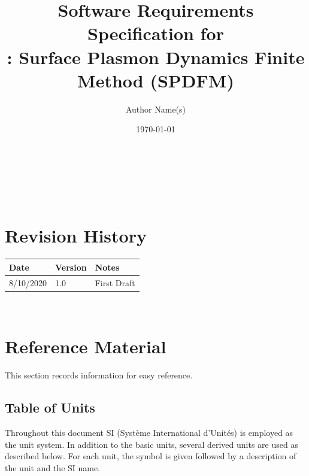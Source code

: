 \documentclass[12pt]{article}
\begin{document}
\title{Software Requirements Specification for\\ \progname: Surface Plasmon Dynamics Finite Method (SPDFM)} 
\author{Author Name(s)}
\date{\today}
	
\maketitle

~\newpage


\tableofcontents

~\newpage

\section*{Revision History}

\begin{tabularx}{\textwidth}{p{3cm}p{2cm}X}
\toprule {\bf Date} & {\bf Version} & {\bf Notes}\\
\midrule
8/10/2020 & 1.0 & First Draft\\
\bottomrule
\end{tabularx}

~\newpage

\section{Reference Material}

This section records information for easy reference.

\subsection{Table of Units}

Throughout this document SI (Syst\`{e}me International d'Unit\'{e}s) is employed
as the unit system.  In addition to the basic units, several derived units are
used as described below.  For each unit, the symbol is given followed by a
description of the unit and the SI name.
~\newline
\end{document}
